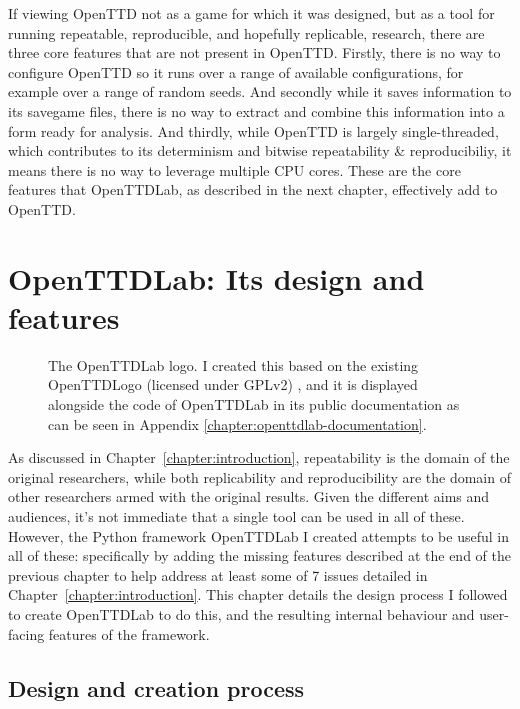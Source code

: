 \documentclass[logo,msc,dsti]{style/infthesis}    %
\begin{document}
{If viewing OpenTTD not as a game for which it was designed, but as a tool for running repeatable, reproducible, and hopefully replicable, research, there are three core features that are not present in OpenTTD. Firstly, there is no way to configure OpenTTD so it runs over a range of available configurations, for example over a range of random seeds. And secondly while it saves information to its savegame files, there is no way to extract and combine this information into a form ready for analysis. And thirdly, while OpenTTD is largely single-threaded, which contributes to its determinism and bitwise repeatability \& reproducibiliy, it means there is no way to leverage multiple CPU cores. These are the core features that OpenTTDLab, as described in the next chapter, effectively add to OpenTTD.

\chapter{OpenTTDLab: Its design and features}
\label{chapter:openttdlab-design-process-and-features}

\begin{figure}[H]
\centering

\caption{The OpenTTDLab logo. I created this based on the existing OpenTTDLogo (licensed under GPLv2) \cite{OpenTTDLogo}, and it is displayed alongside the code of OpenTTDLab in its public documentation as can be seen in Appendix \ref{chapter:openttdlab-documentation}.}
\label{fig:openttlab-logo}
\end{figure}

As discussed in Chapter~\ref{chapter:introduction}, repeatability is the domain of the original researchers, while both replicability and reproducibility are the domain of other researchers armed with the original results. Given the different aims and audiences, it's not immediate that a single tool can be used in all of these. However, the Python framework OpenTTDLab I created attempts to be useful in all of these: specifically by adding the missing features described at the end of the previous chapter to help address at least some of 7 issues detailed in Chapter~\ref{chapter:introduction}. This chapter details the design process I followed to create OpenTTDLab to do this, and the resulting internal behaviour and user-facing features of the framework.

\section{Design and creation process}

}
\end{document}
